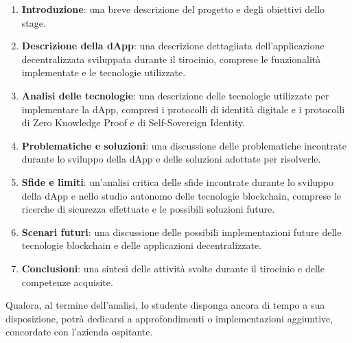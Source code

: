 \begin{enumerate}
    \item \textbf{Introduzione}: una breve descrizione del progetto e degli obiettivi dello stage.
    \item \textbf{Descrizione della dApp}: una descrizione dettagliata dell'applicazione decentralizzata sviluppata durante il tirocinio, comprese le funzionalità implementate e le tecnologie utilizzate.
    \item \textbf{Analisi delle tecnologie}: una descrizione delle tecnologie utilizzate per implementare la dApp, compresi i protocolli di identità digitale e i protocolli di Zero Knowledge Proof e di Self-Sovereign Identity.
    \item \textbf{Problematiche e soluzioni}: una discussione delle problematiche incontrate durante lo sviluppo della dApp e delle soluzioni adottate per risolverle.
    \item \textbf{Sfide e limiti}: un'analisi critica delle sfide incontrate durante lo sviluppo della dApp e nello studio autonomo delle tecnologie blockchain, comprese le ricerche di sicurezza effettuate e le possibili soluzioni future.
    \item \textbf{Scenari futuri}: una discussione delle possibili implementazioni future delle tecnologie blockchain e delle applicazioni decentralizzate.
    \item \textbf{Conclusioni}: una sintesi delle attività svolte durante il tirocinio e delle competenze acquisite.
\end{enumerate}

Qualora, al termine dell'analisi, lo studente disponga ancora di tempo a sua disposizione, potrà dedicarsi a approfondimenti o implementazioni aggiuntive, concordate con l'azienda ospitante.